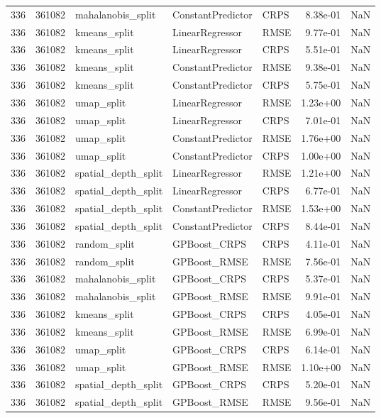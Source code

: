 \begin{tabular}{rrlllrr}
336 & 361082 & mahalanobis\_split & ConstantPredictor & CRPS & 8.38e-01 & NaN \\
336 & 361082 & kmeans\_split & LinearRegressor & RMSE & 9.77e-01 & NaN \\
336 & 361082 & kmeans\_split & LinearRegressor & CRPS & 5.51e-01 & NaN \\
336 & 361082 & kmeans\_split & ConstantPredictor & RMSE & 9.38e-01 & NaN \\
336 & 361082 & kmeans\_split & ConstantPredictor & CRPS & 5.75e-01 & NaN \\
336 & 361082 & umap\_split & LinearRegressor & RMSE & 1.23e+00 & NaN \\
336 & 361082 & umap\_split & LinearRegressor & CRPS & 7.01e-01 & NaN \\
336 & 361082 & umap\_split & ConstantPredictor & RMSE & 1.76e+00 & NaN \\
336 & 361082 & umap\_split & ConstantPredictor & CRPS & 1.00e+00 & NaN \\
336 & 361082 & spatial\_depth\_split & LinearRegressor & RMSE & 1.21e+00 & NaN \\
336 & 361082 & spatial\_depth\_split & LinearRegressor & CRPS & 6.77e-01 & NaN \\
336 & 361082 & spatial\_depth\_split & ConstantPredictor & RMSE & 1.53e+00 & NaN \\
336 & 361082 & spatial\_depth\_split & ConstantPredictor & CRPS & 8.44e-01 & NaN \\
336 & 361082 & random\_split & GPBoost\_CRPS & CRPS & 4.11e-01 & NaN \\
336 & 361082 & random\_split & GPBoost\_RMSE & RMSE & 7.56e-01 & NaN \\
336 & 361082 & mahalanobis\_split & GPBoost\_CRPS & CRPS & 5.37e-01 & NaN \\
336 & 361082 & mahalanobis\_split & GPBoost\_RMSE & RMSE & 9.91e-01 & NaN \\
336 & 361082 & kmeans\_split & GPBoost\_CRPS & CRPS & 4.05e-01 & NaN \\
336 & 361082 & kmeans\_split & GPBoost\_RMSE & RMSE & 6.99e-01 & NaN \\
336 & 361082 & umap\_split & GPBoost\_CRPS & CRPS & 6.14e-01 & NaN \\
336 & 361082 & umap\_split & GPBoost\_RMSE & RMSE & 1.10e+00 & NaN \\
336 & 361082 & spatial\_depth\_split & GPBoost\_CRPS & CRPS & 5.20e-01 & NaN \\
336 & 361082 & spatial\_depth\_split & GPBoost\_RMSE & RMSE & 9.56e-01 & NaN \\

\end{tabular}
